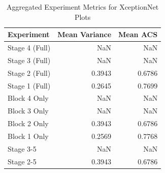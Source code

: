 \begin{table}
\caption{Aggregated Experiment Metrics for XceptionNet Plots}
\label{tab:exp_plot_data_xceptionnet}
\begin{tabular}{lrr}
\toprule
Experiment & Mean Variance & Mean ACS \\
\midrule
Stage 4 (Full) & NaN & NaN \\
Stage 3 (Full) & NaN & NaN \\
Stage 2 (Full) & 0.3943 & 0.6786 \\
Stage 1 (Full) & 0.2645 & 0.7699 \\
Block 4 Only & NaN & NaN \\
Block 3 Only & NaN & NaN \\
Block 2 Only & 0.3943 & 0.6786 \\
Block 1 Only & 0.2569 & 0.7768 \\
Stage 3-5 & NaN & NaN \\
Stage 2-5 & 0.3943 & 0.6786 \\
\bottomrule
\end{tabular}
\end{table}
